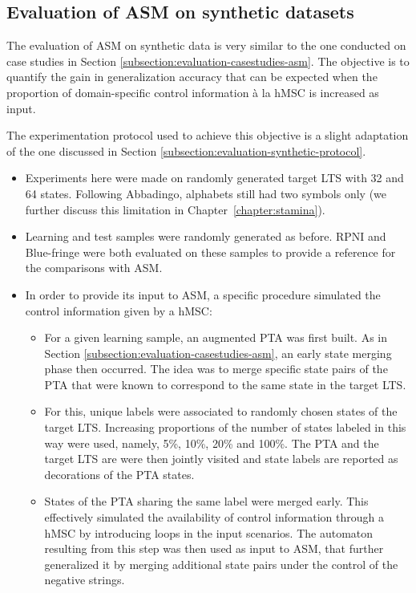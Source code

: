 \subsection{Evaluation of ASM on synthetic datasets\label{subsection:evaluation-synthetic-asm}}

The evaluation of ASM on synthetic data is very similar to the one conducted on case studies in Section \ref{subsection:evaluation-casestudies-asm}. The objective is to quantify the gain in generalization accuracy that can be expected when the proportion of domain-specific control information \`a la hMSC is increased as input. 

The experimentation protocol used to achieve this objective is a slight adaptation of the one discussed in Section \ref{subsection:evaluation-synthetic-protocol}.
\begin{itemize}
\item Experiments here were made on randomly generated target LTS with 32 and 64 states. Following Abbadingo, alphabets still had two symbols only (we further discuss this limitation in Chapter~\ref{chapter:stamina}).
\item Learning and test samples were randomly generated as before. RPNI and Blue-fringe were both evaluated on these samples to provide a reference for the comparisons with ASM.  
\item In order to provide its input to ASM, a specific procedure simulated the control information given by a hMSC:
\begin{itemize}
\item For a given learning sample, an augmented PTA was first built. As in Section \ref{subsection:evaluation-casestudies-asm}, an early state merging phase then occurred. The idea was to merge specific state pairs of the PTA that were known to correspond to the same state in the target LTS.
\item For this, unique labels were associated to randomly chosen states of the target LTS. Increasing proportions of the number of states labeled in this way were used, namely, 5\%, 10\%, 20\% and 100\%. The PTA and the target LTS are were then jointly visited and state labels are reported as decorations of the PTA states. 
\item States of the PTA sharing the same label were merged early. This effectively simulated the availability of control information through a hMSC by introducing loops in the input scenarios. The automaton resulting from this step was then used as input to ASM, that further generalized it by merging additional state pairs under the control of the negative strings.
\end{itemize}
\end{itemize}
 

